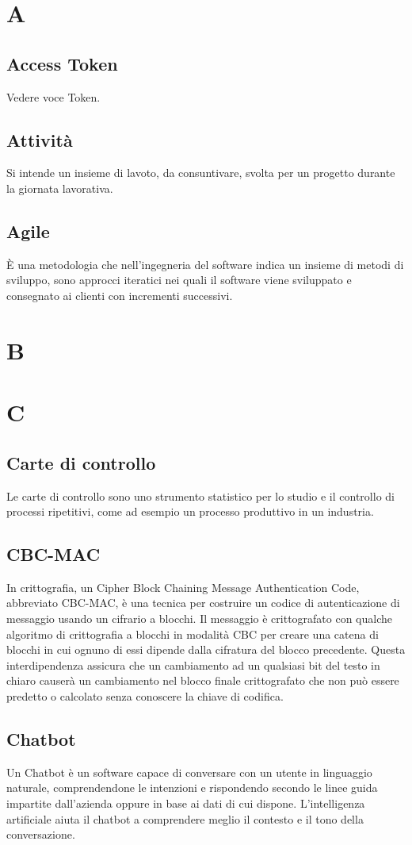 \section{A}
\subsection{Access Token}
Vedere voce Token.
\subsection{Attività}
Si intende un insieme di lavoto, da consuntivare, svolta per un progetto durante la giornata lavorativa.
\subsection{Agile}
È una metodologia che nell'ingegneria del software indica un insieme di metodi di sviluppo, sono approcci iteratici nei quali il software viene sviluppato e consegnato ai clienti con incrementi successivi.
\newpage
\section{B}
\section{C}
\subsection{Carte di controllo}
Le carte di controllo sono uno strumento statistico per lo studio e il controllo di processi ripetitivi, come ad esempio un processo produttivo in un industria.
\subsection{CBC-MAC}
In crittografia, un Cipher Block Chaining Message Authentication Code, abbreviato CBC-MAC, è una tecnica per costruire un codice di autenticazione di messaggio usando un cifrario a blocchi. Il messaggio è crittografato con qualche algoritmo di crittografia a blocchi in modalità CBC per creare una catena di blocchi in cui ognuno di essi dipende dalla cifratura del blocco precedente. Questa interdipendenza assicura che un cambiamento ad un qualsiasi bit del testo in chiaro causerà un cambiamento nel blocco finale crittografato che non può essere predetto o calcolato senza conoscere la chiave di codifica.
\subsection{Chatbot}
Un Chatbot è un software capace di conversare con un utente in linguaggio naturale, comprendendone 
le intenzioni e rispondendo secondo le linee guida impartite dall'azienda oppure in 
base ai dati di cui dispone. L'intelligenza artificiale aiuta il chatbot a comprendere meglio il 
contesto e il tono della conversazione.
